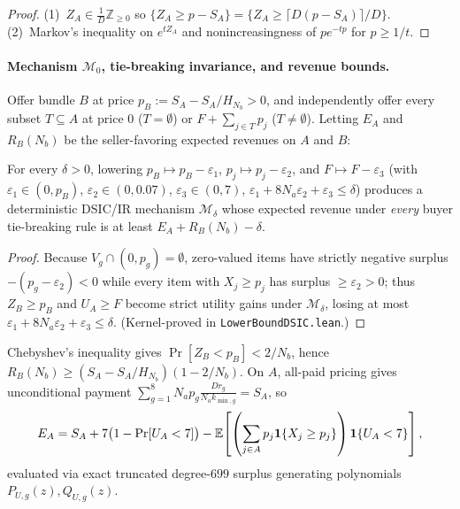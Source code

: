 \begin{proof}
(1)~$Z_A \in \frac{1}{D}\mathbb{Z}_{\ge 0}$ so $\{Z_A \ge p - S_A\} = \{Z_A \ge \lceil D(p-S_A)\rceil/D\}$. (2)~Markov's inequality on $e^{tZ_A}$ and nonincreasingness of $pe^{-tp}$ for $p \ge 1/t$.
\end{proof}

\paragraph{Mechanism $\mathcal{M}_0$, tie-breaking invariance, and revenue bounds.}
Offer bundle $B$ at price $p_B := S_A - S_A/H_{N_b} > 0$, and independently offer every subset $T \subseteq A$ at price $0$ ($T = \emptyset$) or $F + \sum_{j\in T} p_j$ ($T \neq \emptyset$). Letting $E_A$ and $R_B(N_b)$ be the seller-favoring expected revenues on $A$ and $B$:

\begin{lemma}\label{lem:tiebreak}
For every $\delta > 0$, lowering $p_B \mapsto p_B - \varepsilon_1$, $p_j \mapsto p_j - \varepsilon_2$, and $F \mapsto F - \varepsilon_3$ (with $\varepsilon_1 \in (0, p_B)$, $\varepsilon_2 \in (0, 0.07)$, $\varepsilon_3 \in (0, 7)$, $\varepsilon_1 + 8N_a\varepsilon_2 + \varepsilon_3 \le \delta$) produces a deterministic DSIC/IR mechanism $\mathcal{M}_\delta$ whose expected revenue under \emph{every} buyer tie-breaking rule is at least $E_A + R_B(N_b) - \delta$.
\end{lemma}

\begin{proof}
Because $V_g \cap (0, p_g) = \emptyset$, zero-valued items have strictly negative surplus $-(p_g - \varepsilon_2) < 0$ while every item with $X_j \ge p_j$ has surplus $\ge \varepsilon_2 > 0$; thus $Z_B \ge p_B$ and $U_A \ge F$ become strict utility gains under $\mathcal{M}_\delta$, losing at most $\varepsilon_1 + 8N_a\varepsilon_2 + \varepsilon_3 \le \delta$. (Kernel-proved in \texttt{LowerBoundDSIC.lean}.)
\end{proof}

Chebyshev's inequality gives $\Pr[Z_B < p_B] < 2/N_b$, hence $R_B(N_b) \ge (S_A - S_A/H_{N_b})(1 - 2/N_b)$. On $A$, all-paid pricing gives unconditional payment $\sum_{g=1}^8 N_a p_g \frac{D r_g}{N_a k_{\min,g}} = S_A$, so
\[
  E_A = S_A + 7\big(1 - \Pr[U_A < 7]\big) - \mathbb{E}\!\left[\left(\sum_{j\in A} p_j\mathbf{1}\{X_j \ge p_j\}\right)\mathbf{1}\{U_A < 7\}\right],
\]
evaluated via exact truncated degree-$699$ surplus generating polynomials $P_{U,g}(z), Q_{U,g}(z)$.

